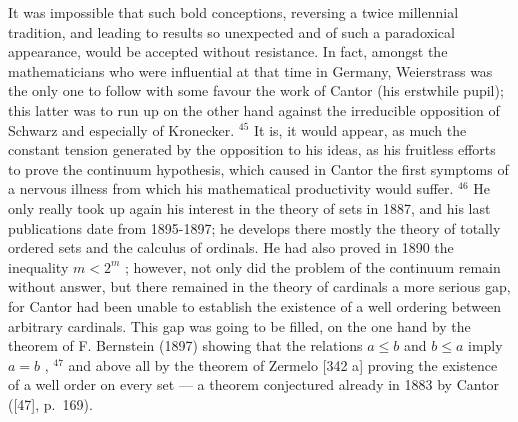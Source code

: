 It was impossible that such bold conceptions, reversing a twice millennial tradition, and leading to results so unexpected and of such a paradoxical appearance, would be accepted without resistance. In fact, amongst the mathematicians who were influential at that time in Germany, Weierstrass was the only one to follow with some favour the work of Cantor (his erstwhile pupil); this latter was to run up on the other hand against the irreducible opposition of Schwarz and especially of Kronecker. \(^{45}\) It is, it would appear, as much the constant tension generated by the opposition to his ideas, as his fruitless efforts to prove the continuum hypothesis, which caused in Cantor the first symptoms of a nervous illness from which his mathematical productivity would suffer. \(^{46}\) He only really took up again his interest in the theory of sets in 1887, and his last publications date from 1895-1897; he develops there mostly the theory of totally ordered sets and the calculus of ordinals. He had also proved in 1890 the inequality \(m < 2^{m}\) ; however, not only did the problem of the continuum remain without answer, but there remained in the theory of cardinals a more serious gap, for Cantor had been unable to establish the existence of a well ordering between arbitrary cardinals. This gap was going to be filled, on the one hand by the theorem of F. Bernstein (1897) showing that the relations \(a \leq b\) and \(b \leq a\) imply \(a = b\) , \(^{47}\) and above all by the theorem of Zermelo {[}342 a{]} proving the existence of a well order on every set --- a theorem conjectured already in 1883 by Cantor ({[}47{]}, p.~169).

